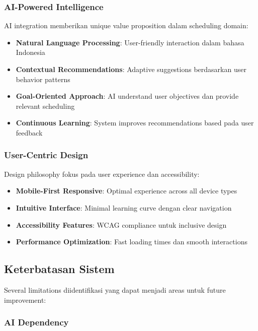 \subsubsection{AI-Powered Intelligence}

AI integration memberikan unique value proposition dalam scheduling domain:

\begin{itemize}
\item \textbf{Natural Language Processing}: User-friendly interaction dalam bahasa Indonesia
\item \textbf{Contextual Recommendations}: Adaptive suggestions berdasarkan user behavior patterns
\item \textbf{Goal-Oriented Approach}: AI understand user objectives dan provide relevant scheduling
\item \textbf{Continuous Learning}: System improves recommendations based pada user feedback
\end{itemize}

\subsubsection{User-Centric Design}

Design philosophy fokus pada user experience dan accessibility:

\begin{itemize}
\item \textbf{Mobile-First Responsive}: Optimal experience across all device types
\item \textbf{Intuitive Interface}: Minimal learning curve dengan clear navigation
\item \textbf{Accessibility Features}: WCAG compliance untuk inclusive design
\item \textbf{Performance Optimization}: Fast loading times dan smooth interactions
\end{itemize}

\subsection{Keterbatasan Sistem}

Several limitations diidentifikasi yang dapat menjadi areas untuk future improvement:

\subsubsection{AI Dependency}

